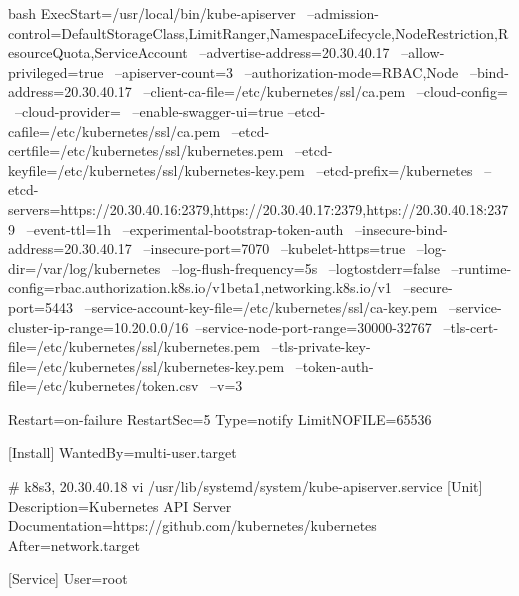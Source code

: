 \begin{outline}[enumerate]
\begin{code-in-enumerate}{bash}
ExecStart=/usr/local/bin/kube-apiserver \
    --admission-control=DefaultStorageClass,LimitRanger,NamespaceLifecycle,NodeRestriction,ResourceQuota,ServiceAccount \
    --advertise-address=20.30.40.17 \
    --allow-privileged=true \
    --apiserver-count=3 \
    --authorization-mode=RBAC,Node \
    --bind-address=20.30.40.17 \
    --client-ca-file=/etc/kubernetes/ssl/ca.pem \
    --cloud-config= \
    --cloud-provider= \
    --enable-swagger-ui=true --etcd-cafile=/etc/kubernetes/ssl/ca.pem \
    --etcd-certfile=/etc/kubernetes/ssl/kubernetes.pem \
    --etcd-keyfile=/etc/kubernetes/ssl/kubernetes-key.pem \
    --etcd-prefix=/kubernetes \
    --etcd-servers=https://20.30.40.16:2379,https://20.30.40.17:2379,https://20.30.40.18:2379 \
    --event-ttl=1h \
    --experimental-bootstrap-token-auth \
    --insecure-bind-address=20.30.40.17 \
    --insecure-port=7070 \
    --kubelet-https=true \
    --log-dir=/var/log/kubernetes \
    --log-flush-frequency=5s \
    --logtostderr=false \
    --runtime-config=rbac.authorization.k8s.io/v1beta1,networking.k8s.io/v1 \
    --secure-port=5443 \
    --service-account-key-file=/etc/kubernetes/ssl/ca-key.pem \
    --service-cluster-ip-range=10.20.0.0/16\
    --service-node-port-range=30000-32767 \
    --tls-cert-file=/etc/kubernetes/ssl/kubernetes.pem \
    --tls-private-key-file=/etc/kubernetes/ssl/kubernetes-key.pem \
    --token-auth-file=/etc/kubernetes/token.csv \
    --v=3

Restart=on-failure
RestartSec=5
Type=notify
LimitNOFILE=65536

[Install]
WantedBy=multi-user.target

# k8s3, 20.30.40.18
vi /usr/lib/systemd/system/kube-apiserver.service
[Unit]
Description=Kubernetes API Server
Documentation=https://github.com/kubernetes/kubernetes
After=network.target

[Service]
User=root


\end{code-in-enumerate}
\end{outline}
